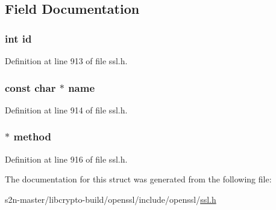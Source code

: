 \subsection{Field Documentation}
\subsubsection[{\texorpdfstring{id}{id}}]{\setlength{\rightskip}{0pt plus 5cm}int id}\hypertarget{structssl__comp__st_a7441ef0865bcb3db9b8064dd7375c1ea}{}\label{structssl__comp__st_a7441ef0865bcb3db9b8064dd7375c1ea}


Definition at line 913 of file ssl.\+h.

\subsubsection[{\texorpdfstring{name}{name}}]{\setlength{\rightskip}{0pt plus 5cm}const char $\ast$ name}\hypertarget{structssl__comp__st_afcd1706c9144e6d6eee6127661ae3be2}{}\label{structssl__comp__st_afcd1706c9144e6d6eee6127661ae3be2}


Definition at line 914 of file ssl.\+h.

\subsubsection[{\texorpdfstring{method}{method}}]{ $\ast$ method}\hypertarget{structssl__comp__st_aa30fcf5a25127ee20b059c94d712b640}{}\label{structssl__comp__st_aa30fcf5a25127ee20b059c94d712b640}


Definition at line 916 of file ssl.\+h.



The documentation for this struct was generated from the following file\+:\begin{DoxyCompactItemize}
\item 
s2n-\/master/libcrypto-\/build/openssl/include/openssl/\hyperlink{include_2openssl_2ssl_8h}{ssl.\+h}\end{DoxyCompactItemize}
